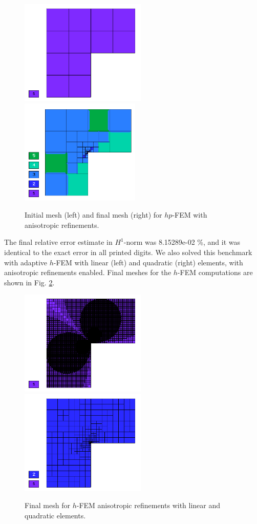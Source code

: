 \begin{figure}[!ht]
\centering
\includegraphics[height=5cm]{nist/nist-2/mesh_hp_aniso_init.png}\ \
\includegraphics[height=5cm]{nist/nist-2/mesh_hp_aniso.png}
\caption{Initial mesh (left) and final mesh (right) for $hp$-FEM with anisotropic refinements.}
\label{fig:nist-2-hp-aniso}
\end{figure}

The final relative error estimate in $H^1$-norm was 8.15289e-02 \%,
and it was identical to the exact error in all printed digits.
We also solved this benchmark with adaptive $h$-FEM
with linear (left) and quadratic (right)
elements, with anisotropic refinements enabled.
Final meshes for the $h$-FEM computations are shown
in Fig. \ref{fig:nist-2-h-aniso}.

\begin{figure}[!ht]
\centering
\includegraphics[height=5cm]{nist/nist-2/mesh_h1_aniso.png}\ \
\includegraphics[height=5cm]{nist/nist-2/mesh_h2_aniso.png}
\caption{Final mesh for $h$-FEM anisotropic refinements with linear and quadratic elements.}
\label{fig:nist-2-h-aniso}
\end{figure}


